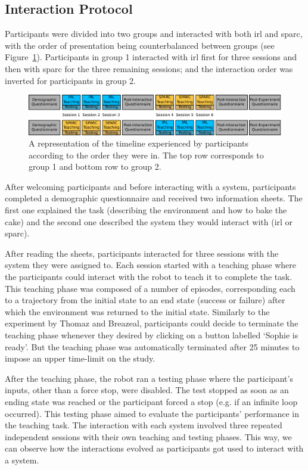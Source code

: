 \subsection{Interaction Protocol}

Participants were divided into two groups and interacted with both \gls{irl} and \gls{sparc}, with the order of presentation being counterbalanced between groups (see Figure~\ref{fig:control_design}). Participants in group 1 interacted with \gls{irl} first for three sessions and then with \gls{sparc} for the three remaining sessions; and the interaction order was inverted for participants in group 2. 

\begin{figure}[ht]
	\centering
	\includegraphics[width=1\textwidth]{protocol.pdf}
	\caption{A representation of the timeline experienced by participants according to the order they were in. The top row corresponds to group 1 and bottom row to group 2.}
	\label{fig:control_design}
\end{figure}

After welcoming participants and before interacting with a system, participants completed a demographic questionnaire and received two information sheets. The first one explained the task (describing the environment and how to bake the cake) and the second one described the system they would interact with (\gls{irl} or \gls{sparc}). 

After reading the sheets, participants interacted for three sessions with the system they were assigned to. Each session started with a teaching phase where the participants could interact with the robot to teach it to complete the task. This teaching phase was composed of a number of episodes, corresponding each to a trajectory from the initial state to an end state (success or failure) after which the environment was returned to the initial state. Similarly to the experiment by Thomaz and Breazeal, participants could decide to terminate the teaching phase whenever they desired by clicking on a button labelled `Sophie is ready'. But the teaching phase was automatically terminated after 25 minutes to impose an upper time-limit on the study. 

After the teaching phase, the robot ran a testing phase where the participant's inputs, other than a force stop, were disabled. The test stopped as soon as an ending state was reached or the participant forced a stop (e.g. if an infinite loop occurred). This testing phase aimed to evaluate the participants' performance in the teaching task. The interaction with each system involved three repeated independent sessions with their own teaching and testing phases. This way, we can observe how the interactions evolved as participants got used to interact with a system.

